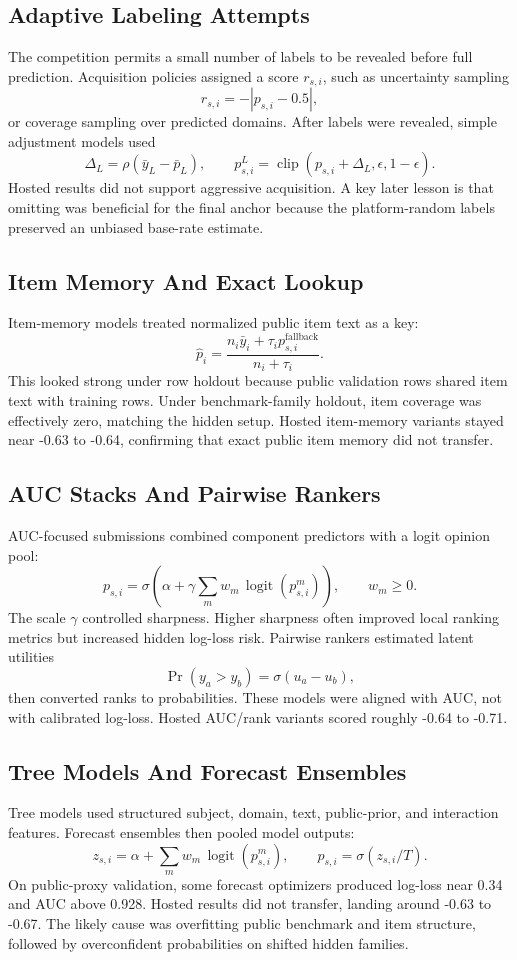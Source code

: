 \documentclass[11pt]{article}
\begin{document}
\subsection{Adaptive Labeling Attempts}
The competition permits a small number of labels to be revealed before full prediction. Acquisition policies assigned a score \(r_{s,i}\), such as uncertainty sampling
\[
  r_{s,i}=-|p_{s,i}-0.5|,
\]
or coverage sampling over predicted domains. After labels were revealed, simple adjustment models used
\[
  \Delta_L=\rho(\bar y_L-\bar p_L),
  \qquad
  p^L_{s,i}=\operatorname{clip}(p_{s,i}+\Delta_L,\epsilon,1-\epsilon).
\]
Hosted results did not support aggressive acquisition. A key later lesson is that omitting  was beneficial for the final anchor because the platform-random labels preserved an unbiased base-rate estimate.

\subsection{Item Memory And Exact Lookup}
Item-memory models treated normalized public item text as a key:
\[
  \hat p_i
  =
  \frac{n_i\bar y_i+\tau_i p^{\mathrm{fallback}}_{s,i}}{n_i+\tau_i}.
\]
This looked strong under row holdout because public validation rows shared item text with training rows. Under benchmark-family holdout, item coverage was effectively zero, matching the hidden setup. Hosted item-memory variants stayed near -0.63 to -0.64, confirming that exact public item memory did not transfer.

\subsection{AUC Stacks And Pairwise Rankers}
AUC-focused submissions combined component predictors with a logit opinion pool:
\[
  p_{s,i}
  =
  \sigma\left(
    \alpha+\gamma\sum_m w_m\,\operatorname{logit}(p^m_{s,i})
  \right),
  \qquad
  w_m\ge 0.
\]
The scale \(\gamma\) controlled sharpness. Higher sharpness often improved local ranking metrics but increased hidden log-loss risk. Pairwise rankers estimated latent utilities
\[
  \Pr(y_a>y_b)=\sigma(u_a-u_b),
\]
then converted ranks to probabilities. These models were aligned with AUC, not with calibrated log-loss. Hosted AUC/rank variants scored roughly -0.64 to -0.71.

\subsection{Tree Models And Forecast Ensembles}
Tree models used structured subject, domain, text, public-prior, and interaction features. Forecast ensembles then pooled model outputs:
\[
  z_{s,i}=\alpha+\sum_m w_m\,\operatorname{logit}(p^m_{s,i}),
  \qquad
  p_{s,i}=\sigma(z_{s,i}/T).
\]
On public-proxy validation, some forecast optimizers produced log-loss near 0.34 and AUC above 0.928. Hosted results did not transfer, landing around -0.63 to -0.67. The likely cause was overfitting public benchmark and item structure, followed by overconfident probabilities on shifted hidden families.
\end{document}
